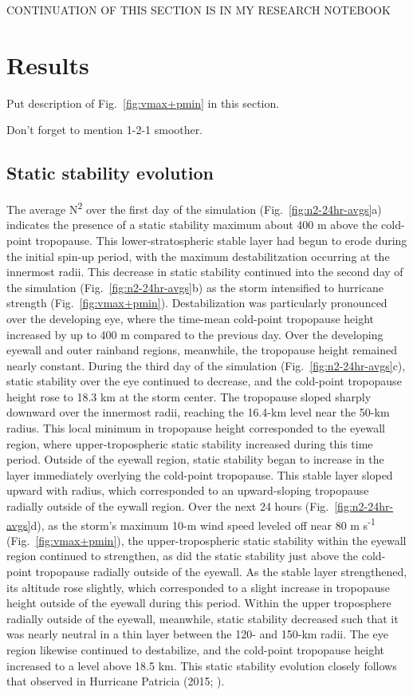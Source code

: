 \documentclass{ametsoc}
\begin{document}
CONTINUATION OF THIS SECTION IS IN MY RESEARCH NOTEBOOK

 \section{Results}

Put description of Fig.~\ref{fig:vmax+pmin} in this section. 

Don't forget to mention 1-2-1 smoother.

 \subsection{Static stability evolution}

The average N\textsuperscript{2} over the first day of the simulation (Fig.~\ref{fig:n2-24hr-avgs}a) indicates the presence of a static stability maximum about 400 m above the cold-point tropopause.
This lower-stratospheric stable layer had begun to erode during the initial spin-up period, with the maximum destabilitzation occurring at the innermost radii.
This decrease in static stability continued into the second day of the simulation (Fig.~\ref{fig:n2-24hr-avgs}b) as the storm intensified to hurricane strength (Fig.~\ref{fig:vmax+pmin}).
Destabilization was particularly pronounced over the developing eye, where the time-mean cold-point tropopause height increased by up to 400 m compared to the previous day.
Over the developing eyewall and outer rainband regions, meanwhile, the tropopause height remained nearly constant.
During the third day of the simulation (Fig.~\ref{fig:n2-24hr-avgs}c), static stability over the eye continued to decrease, and the cold-point tropopause height rose to 18.3 km at the storm center.
The tropopause sloped sharply downward over the innermost radii, reaching the 16.4-km level near the 50-km radius.
This local minimum in tropopause height corresponded to the eyewall region, where upper-tropospheric static stability increased during this time period.
Outside of the eyewall region, static stability began to increase in the layer immediately overlying the cold-point tropopause.
This stable layer sloped upward with radius, which corresponded to an upward-sloping tropopause radially outside of the eywall region.
Over the next 24 hours (Fig.~\ref{fig:n2-24hr-avgs}d), as the storm's maximum 10-m wind speed leveled off near 80 m s\textsuperscript{-1} (Fig.~\ref{fig:vmax+pmin}), the upper-tropospheric static stability within the eyewall region continued to strengthen, as did the static stability just above the cold-point tropopause radially outside of the eyewall.
As the stable layer strengthened, its altitude rose slightly, which corresponded to a slight increase in tropopause height outside of the eyewall during this period.
Within the upper troposphere radially outside of the eyewall, meanwhile, static stability decreased such that it was nearly neutral in a thin layer between the 120- and 150-km radii.
The eye region likewise continued to destabilize, and the cold-point tropopause height increased to a level above 18.5 km.
This static stability evolution closely follows that observed in Hurricane Patricia (2015; \citeauthor{Duran+Molinari2018} \citeyear{Duran+Molinari2018}).
\end{document}
